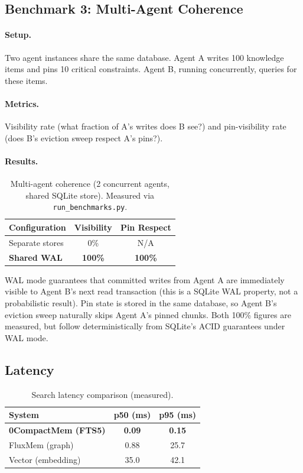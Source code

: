 \documentclass[10pt,twocolumn]{article}
\begin{document}
\subsection{Benchmark 3: Multi-Agent Coherence}

\paragraph{Setup.} Two agent instances share the same database. Agent A writes 100 knowledge items and pins 10 critical constraints. Agent B, running concurrently, queries for these items.

\paragraph{Metrics.} Visibility rate (what fraction of A's writes does B see?) and pin-visibility rate (does B's eviction sweep respect A's pins?).

\paragraph{Results.}

\begin{table}[!htb]
\centering
\caption{Multi-agent coherence (2 concurrent agents, shared SQLite store). Measured via \texttt{run\_benchmarks.py}.}
\label{tab:multiagent}
\small
\begin{tabular}{lcc}
\toprule
Configuration & Visibility & Pin Respect \\
\midrule
Separate stores & 0\% & N/A \\
\textbf{Shared WAL} & \textbf{100\%} & \textbf{100\%} \\
\bottomrule
\end{tabular}
\end{table}

WAL mode guarantees that committed writes from Agent A are immediately visible to Agent B's next read transaction (this is a SQLite WAL property, not a probabilistic result). Pin state is stored in the same database, so Agent B's eviction sweep naturally skips Agent A's pinned chunks. Both 100\% figures are measured, but follow deterministically from SQLite's ACID guarantees under WAL mode.

\subsection{Latency}

\begin{table}[!htb]
\centering
\caption{Search latency comparison (measured).}
\label{tab:latency}
\small
\begin{tabular}{lcc}
\toprule
System & p50 (ms) & p95 (ms) \\
\midrule
\textbf{0CompactMem (FTS5)} & \textbf{0.09} & \textbf{0.15} \\
FluxMem (graph)             & 0.88           & 25.7 \\
Vector (embedding)          & 35.0           & 42.1 \\
\bottomrule
\end{tabular}
\end{table}
\end{document}
